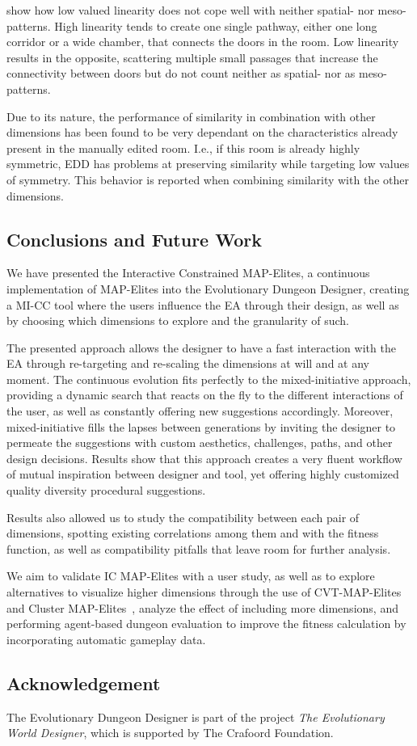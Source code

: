  show how low valued linearity does not cope well with neither spatial- nor meso-patterns. High linearity tends to create one single pathway, either one long corridor or a wide chamber, that connects the doors in the room. Low linearity results in the opposite, scattering multiple small passages that increase the connectivity between doors but do not count neither as spatial- nor as meso-patterns.

Due to its nature, the performance of similarity in combination with other dimensions has been found to be very dependant on the characteristics already present in the manually edited room. I.e., if this room is already highly symmetric, EDD has problems at preserving similarity while targeting low values of symmetry. This behavior is reported when combining similarity with the other dimensions.

\subsection{Conclusions and Future Work\label{section:conclusion}}
We have presented the Interactive Constrained MAP-Elites, a continuous implementation of MAP-Elites into the Evolutionary Dungeon Designer, creating a MI-CC tool where the users influence the EA through their design, as well as by choosing which dimensions to explore and the granularity of such. 

The presented approach allows the designer to have a fast interaction with the EA through re-targeting and re-scaling the dimensions at will and at any moment. The continuous evolution fits perfectly to the mixed-initiative approach, providing a dynamic search that reacts on the fly to the different interactions of the user, as well as constantly offering new suggestions accordingly. Moreover, mixed-initiative fills the lapses between generations by inviting the designer to permeate the suggestions with custom aesthetics, challenges, paths, and other design decisions. Results show that this approach creates a very fluent workflow of mutual inspiration between designer and tool, yet offering highly customized quality diversity procedural suggestions. 

Results also allowed us to study the compatibility between each pair of dimensions, spotting existing correlations among them and with the fitness function, as well as compatibility pitfalls that leave room for further analysis.

We aim to validate IC MAP-Elites with a user study, as well as to explore alternatives to visualize higher dimensions through the use of CVT-MAP-Elites~ and Cluster MAP-Elites~, analyze the effect of including more dimensions, and performing agent-based dungeon evaluation to improve the fitness calculation by incorporating automatic gameplay data.

\subsection*{Acknowledgement}
The Evolutionary Dungeon Designer is part of the project \textit{The Evolutionary World Designer}, which is supported by The Crafoord Foundation.

